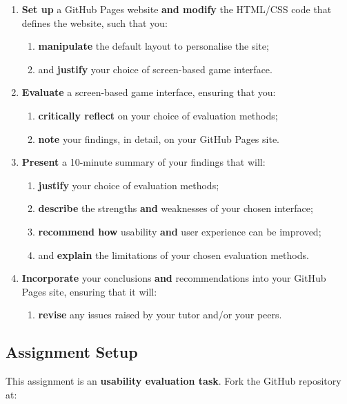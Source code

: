 \documentclass{../../fal_assignment}
\begin{document}
\begin{enumerate}[label=(\alph*)]
    \item \textbf{Set up} a GitHub Pages website \textbf{and modify} the HTML/CSS code that defines the website, such that you: 
    	\begin{enumerate}[label=\roman*.]
    		\item \textbf{manipulate} the default layout to personalise the site;
    		\item and \textbf{justify} your choice of screen-based game interface.
	\end{enumerate}
    \item \textbf{Evaluate} a screen-based game interface, ensuring that you:
    	\begin{enumerate}[label=\roman*.]
    		\item \textbf{critically reflect} on your choice of evaluation methods;
		\item \textbf{note} your findings, in detail, on your GitHub Pages site.
	\end{enumerate}
    \item \textbf{Present} a 10-minute summary of your findings that will:
    	\begin{enumerate}[label=\roman*.]
    		\item \textbf{justify} your choice of evaluation methods;
    		\item \textbf{describe} the strengths \textbf{and} weaknesses of your chosen interface;
    		\item \textbf{recommend how} usability \textbf{and} user experience can be improved;
    		\item and \textbf{explain} the limitations of your chosen evaluation methods.
	\end{enumerate}
	\item \textbf{Incorporate} your conclusions \textbf{and} recommendations into your GitHub Pages site, ensuring that it will:
    	\begin{enumerate}[label=\roman*.]
    		\item \textbf{revise} any issues raised by your tutor and/or your peers.		
	\end{enumerate}
\end{enumerate}

\subsection*{Assignment Setup}

This assignment is an \textbf{usability evaluation task}. Fork the GitHub repository at:
\end{document}
